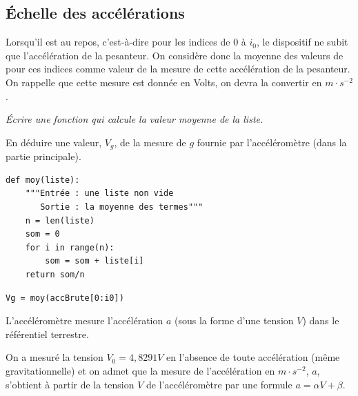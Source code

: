 \subsection{Échelle des accélérations}
Lorsqu'il est au repos, c'est-à-dire pour les indices de 0 à $i_0$, le dispositif ne subit que l'accélération de la pesanteur. On considère donc la moyenne des valeurs de  pour ces indices comme valeur de la mesure de cette accélération de la pesanteur. On rappelle que cette mesure est donnée en Volts, on devra la convertir en $m\cdot s^{-2}$.
\begin{Exercise}\it Écrire une fonction  qui calcule la valeur moyenne de la liste.

En déduire une valeur, $V_g$, de la mesure de $g$ fournie par l'accéléromètre (dans la partie principale).
\end{Exercise}
\begin{Answer}
\begin{lstlisting}
def moy(liste):
    """Entrée : une liste non vide
       Sortie : la moyenne des termes"""
    n = len(liste) 
    som = 0 
    for i in range(n):
        som = som + liste[i] 
    return som/n
\end{lstlisting}

\begin{lstlisting}
Vg = moy(accBrute[0:i0])
\end{lstlisting}
\end{Answer}
\medskip

L'accéléromètre mesure l'accélération $a$ (sous la forme d'une tension $V$) dans le référentiel terrestre.

On a mesuré la tension $V_0= 4,8291 V$ en l'absence de toute accélération (même gravitationnelle) et on admet que la mesure de l'accélération en $m\cdot s^{-2}$, $a$, s'obtient à partir de la tension $V$ de l'accéléromètre par une formule $a = \alpha V+\beta$.

